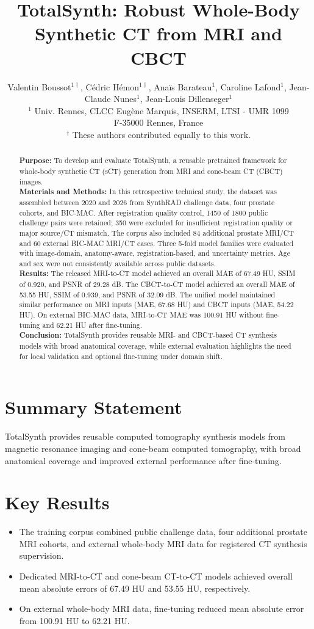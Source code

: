 \documentclass{article}
\title{TotalSynth: Robust Whole-Body Synthetic CT from MRI and CBCT
}
\author{
    Valentin Boussot$^{1\dagger}$, C{\'e}dric H{\'e}mon$^{1\dagger}$, Anaïs Barateau$^{1}$, Caroline Lafond$^{1}$, Jean-Claude Nunes$^{1}$, Jean-Louis Dillenseger$^{1}$\\
    $^1$ Univ. Rennes, CLCC Eug\`ene Marquis, INSERM, LTSI - UMR 1099\\
    F-35000 Rennes, France\\
    $^\dagger$ These authors contributed equally to this work.\\
}
\date{}
\begin{document}
\maketitle
\begin{abstract}
\sloppy
\textbf{Purpose:} To develop and evaluate TotalSynth, a reusable pretrained framework for whole-body synthetic CT (sCT) generation from MRI and cone-beam CT (CBCT) images. \\
\textbf{Materials and Methods:} In this retrospective technical study, the dataset was assembled between 2020 and 2026 from SynthRAD challenge data, four prostate cohorts, and BIC-MAC. After registration quality control, 1450 of 1800 public challenge pairs were retained; 350 were excluded for insufficient registration quality or major source/CT mismatch. The corpus also included 84 additional prostate MRI/CT and 60 external BIC-MAC MRI/CT cases. Three 5-fold model families were evaluated with image-domain, anatomy-aware, registration-based, and uncertainty metrics. Age and sex were not consistently available across public datasets.\\
\textbf{Results:} The released MRI-to-CT model achieved an overall MAE of 67.49 HU, SSIM of 0.920, and PSNR of 29.28 dB. The CBCT-to-CT model achieved an overall MAE of 53.55 HU, SSIM of 0.939, and PSNR of 32.09 dB. The unified model maintained similar performance on MRI inputs (MAE, 67.68 HU) and CBCT inputs (MAE, 54.22 HU). On external BIC-MAC data, MRI-to-CT MAE was 100.91 HU without fine-tuning and 62.21 HU after fine-tuning.\\
\textbf{Conclusion:} TotalSynth provides reusable MRI- and CBCT-based CT synthesis models with broad anatomical coverage, while external evaluation highlights the need for local validation and optional fine-tuning under domain shift.
\end{abstract}

\section*{Summary Statement}
TotalSynth provides reusable computed tomography synthesis models from magnetic resonance imaging and cone-beam computed tomography, with broad anatomical coverage and improved external performance after fine-tuning.

\section*{Key Results}
\begin{itemize}
    \item The training corpus combined public challenge data, four additional prostate MRI cohorts, and external whole-body MRI data for registered CT synthesis supervision.
    \item Dedicated MRI-to-CT and cone-beam CT-to-CT models achieved overall mean absolute errors of 67.49 HU and 53.55 HU, respectively.
    \item On external whole-body MRI data, fine-tuning reduced mean absolute error from 100.91 HU to 62.21 HU.
\end{itemize}
\end{document}
